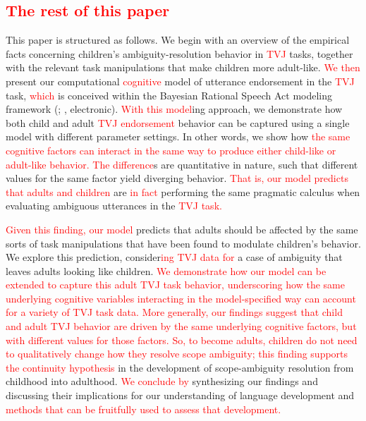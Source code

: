 \documentclass[preprint,authoryear]{elsarticle}\frenchspacing
\newcommand{\lsp}[1]{\textcolor{red}{[lsp: #1]}}
\newcommand{\lp}[1]{\textcolor{red}{#1}} %
\begin{document}
\subsection{\lp{The rest of this paper}}
This paper is structured as follows. We begin 
with an overview of the empirical facts concerning children's ambiguity-resolution behavior in 
\lp{TVJ}
tasks, together with the relevant task manipulations that make children more adult-like. 
\lp{We then}
present our computational \lp{cognitive} model of utterance endorsement in the 
\lp{TVJ}
task,
\lp{which}
is conceived within the Bayesian Rational Speech Act modeling framework (\citealp{goodmanfrank2016}; \citeauthor{scontrasetalproblang}, electronic). 
\lp{With this model}ing approach, we demonstrate how both child and adult \lp{TVJ endorsement} behavior can be captured using a single model with different parameter settings.
In other words, we show how \lp{the same cognitive factors can interact in the same way to produce either child-like or adult-like behavior. The difference}s are quantitative in nature, such that different values for the same factor yield diverging behavior.
\lp{That is, our model predicts that adults and children} 
 are \lp{in fact} performing the same pragmatic calculus when evaluating ambiguous utterances in the 
\lp{TVJ task.}

\lp{Given this finding, our model}
predicts that adults should be affected by the same sorts of task manipulations that have been found to modulate children's behavior.
We explore this prediction, 
consider\lp{ing}
\lp{TVJ data for}
a case of ambiguity that leaves adults looking like children.
\lp{We demonstrate how our model can be extended to capture this adult TVJ task behavior, underscoring how the same underlying cognitive variables interacting in the model-specified way can account for a variety of TVJ task data.}
\lp{More generally, our findings suggest that child and adult TVJ behavior are driven by the same underlying cognitive factors, but with different values for those factors. So, to become adults, children do not need to qualitatively change how they resolve scope ambiguity; this finding supports the continuity hypothesis}
  in the development of scope-ambiguity resolution from childhood into adulthood. 
  \lp{We conclude by}
  synthesizing our findings and discussing their implications for our understanding of language development and 
  \lp{methods that can be fruitfully used to assess that development.}
\end{document}
